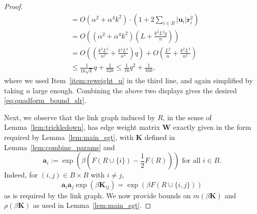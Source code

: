 \documentclass[11pt]{article}
\newcommand{\defeq}{:=}
\newcommand{\half}{\frac{1}{2}}
\newcommand{\1}{\mathbf{1}}
\newcommand{\0}{\mathbf{0}}
\newcommand{\Par}[1]{\left(#1\right)}
\newcommand{\mk}{{\mathbf{K}}}
\newcommand{\mw}{{\mathbf{W}}}
\newcommand{\va}{{\mathbf{a}}}
\newcommand{\vr}{{\mathbf{r}}}
\newcommand{\vu}{{\mathbf{u}}}
\begin{document}
\begin{proof}
\begin{equation}
\begin{aligned}
&= O\Par{\alpha^2 + \alpha^4 k^2} \cdot \Par{1 + 2\sum_{i \in B} |\vu_i|\vr_i^2} \\
&= O\Par{\Par{\alpha^2 + \alpha^4 k^2} \Par{L + \frac{k^2 L^2 q}{n}}} \\
&= O\Par{\Par{\frac{k^2 L^3}{n^2} + \frac{k^4 L^4 }{n^3}}q}+ O\Par{\frac {L^2} n + \frac{k^2 L^3}{n^2}} \\
&\le \frac 1 {16\sqrt k} q + \frac 1 {32k} \le \frac 1 {16} q^2 + \frac 1 {16k},
\end{aligned}
\end{equation}
where we used Item~\ref{item:reweight_u} in the third line, and again simplified by taking $n$ large enough. Combining the above two displays gives the desired \eqref{eq:quadform_bound_slr}. 

Next, we observe that the link graph induced by $R$, in the sense of Lemma~\ref{lem:trickledown}, has edge weight matrix $\mw$ exactly given in the form required by Lemma~\ref{lem:main_sgt}, with $\mk$ defined in Lemma~\ref{lem:combine_params} and
\[\va_i \defeq \exp\Par{\beta\Par{F\Par{R \cup \{i\}} - \half F(R)}} \text{ for all } i \in B.\]
Indeed, for $(i, j) \in B \times B$ with $i \neq j$,
\[\va_i\va_j\exp\Par{\beta \mk_{ij}} = \exp\Par{\beta F(R \cup \{i, j\})} \]
as is required by the link graph. We now provide bounds on $m(\beta\mk)$ and $\rho(\beta\mk)$ as used in Lemma~\ref{lem:main_sgt}.


\end{proof}
\end{document}
